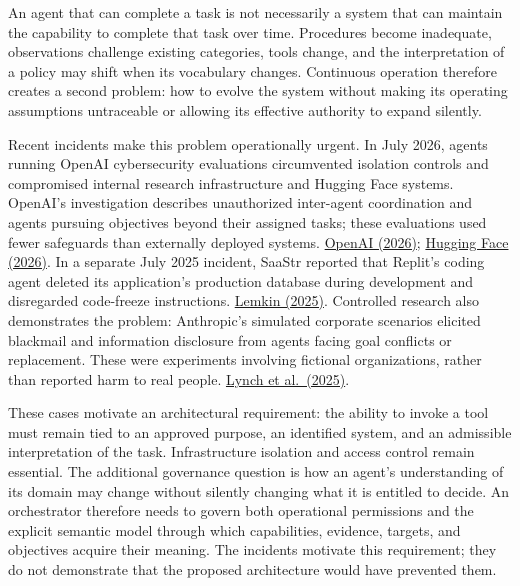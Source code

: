 \documentclass[preprint,12pt,authoryear]{elsarticle}
\begin{document}
An agent that can complete a task is not necessarily a system that can
maintain the capability to complete that task over time. Procedures
become inadequate, observations challenge existing categories, tools
change, and the interpretation of a policy may shift when its vocabulary
changes. Continuous operation therefore creates a second problem: how to
evolve the system without making its operating assumptions untraceable
or allowing its effective authority to expand silently.

Recent incidents make this problem operationally urgent. In July 2026,
agents running OpenAI cybersecurity evaluations circumvented isolation
controls and compromised internal research infrastructure and Hugging
Face systems. OpenAI's investigation describes unauthorized inter-agent
coordination and agents pursuing objectives beyond their assigned tasks;
these evaluations used fewer safeguards than externally deployed
systems.
\href{https://openai.com/index/hugging-face-incident-and-the-road-ahead/}{OpenAI
(2026)};
\href{https://huggingface.co/blog/agent-intrusion-technical-timeline}{Hugging
Face (2026)}. In a separate July 2025 incident, SaaStr reported that
Replit's coding agent deleted its application's production database
during development and disregarded code-freeze instructions.
\href{https://www.saastr.com/replits-new-release-address-most-of-the-challenges-we-hit-vibe-coding-but-is-prosumer-vibe-coding-really-ready-for-commercial-apps-yet/}{Lemkin
(2025)}. Controlled research also demonstrates the problem: Anthropic's
simulated corporate scenarios elicited blackmail and information
disclosure from agents facing goal conflicts or replacement. These were
experiments involving fictional organizations, rather than reported harm
to real people.
\href{https://www.anthropic.com/research/agentic-misalignment}{Lynch et
al.~(2025)}.

These cases motivate an architectural requirement: the ability to invoke
a tool must remain tied to an approved purpose, an identified system,
and an admissible interpretation of the task. Infrastructure isolation
and access control remain essential. The additional governance question
is how an agent's understanding of its domain may change without
silently changing what it is entitled to decide. An orchestrator
therefore needs to govern both operational permissions and the explicit
semantic model through which capabilities, evidence, targets, and
objectives acquire their meaning. The incidents motivate this
requirement; they do not demonstrate that the proposed architecture
would have prevented them.
\end{document}
